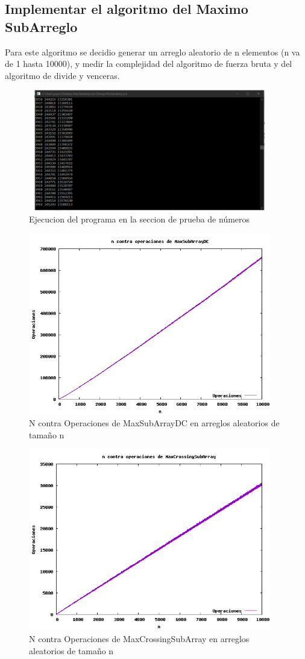 \documentclass[spanish]{article}
\begin{document}
	\subsection{Implementar el algoritmo del Maximo SubArreglo}
	Para este algoritmo se decidio generar un arreglo aleatorio de n elementos (n va de 1 hasta 10000), y medir la complejidad del algoritmo de fuerza bruta y del algoritmo de divide y venceras.
	\begin{figure}[H]
		\centering
		\includegraphics[width=400px,height=200px]{ejecucionSegundaParte}
		\caption{Ejecucion del programa en la seccion de prueba de números}
	\end{figure}
	\begin{figure}[H]
		\centering
		\includegraphics[width=400px,height=300px]{grafica8}
		\caption{N contra Operaciones de MaxSubArrayDC en arreglos aleatorios de tamaño n}
	\end{figure}
	\begin{figure}[H]
		\centering
		\includegraphics[width=400px,height=300px]{grafica9}
		\caption{N contra Operaciones de MaxCrossingSubArray en arreglos aleatorios de tamaño n}
	\end{figure}
\end{document}
